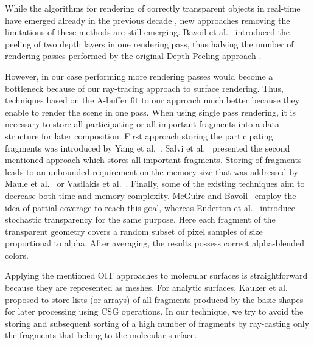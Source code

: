 While the algorithms for rendering of correctly transparent objects in real-time have emerged already in the previous decade \cite{everitt2001interactive}, new approaches removing the limitations of these methods are still emerging.
Bavoil et al.~\cite{bavoil2008order} introduced the peeling of two depth layers in one rendering pass, thus halving the number of rendering passes performed by the original Depth Peeling approach \cite{everitt2001interactive}.

However, in our case performing more rendering passes would become a bottleneck because of our ray-tracing approach to surface rendering.
Thus, techniques based on the A-buffer fit to our approach much better because they enable to render the scene in one pass.
When using single pass rendering, it is necessary to store all participating or all important fragments into a data structure for later composition.
First approach storing the participating fragments was introduced by Yang et al.~\cite{yang2010real}. Salvi et al.~\cite{salvi2011adaptive} presented the second mentioned approach which stores all important fragments.
Storing of fragments leads to an unbounded requirement on the memory size that was addressed by Maule et al.~\cite{maule2012memory} or Vasilakis et al.~\cite{vasilakis2015k+buffer}.
Finally, some of the existing techniques aim to decrease both time and memory complexity.
McGuire and Bavoil~\cite{mcguire2013weighted} employ the idea of partial coverage to reach this goal, whereas Enderton et al.~\cite{enderton2011stochastic} introduce stochastic transparency for the same purpose. 
Here each fragment of the transparent geometry covers a random subset of pixel samples of size proportional to alpha. 
After averaging, the results possess correct alpha-blended colors. 

Applying the mentioned OIT approaches to molecular surfaces is straightforward because they are represented as meshes.
For analytic surfaces, Kauker et al.~\cite{kauker2013rendering} proposed to store lists (or arrays) of all fragments produced by the basic shapes for later processing using CSG operations.
In our technique, we try to avoid the storing and subsequent sorting of a high number of fragments by ray-casting only the fragments that belong to the molecular surface.

